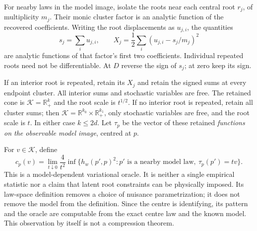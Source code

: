 \documentclass[11pt,reqno]{amsart}
\numberwithin{equation}{section}
\theoremstyle{definition}
\theoremstyle{remark}
\newcommand{\R}{\mathbb R}
\newcommand{\cK}{\mathcal K}
\begin{document}
For nearby laws in the model image, isolate the roots near each central root $r_j$, of multiplicity $m_j$. Their monic cluster factor is an analytic function of the recovered coefficients. Writing the root displacements as $u_{j,i}$, the quantities
\[
 s_j=\sum_i u_{j,i},\qquad
 X_j=\frac12\sum_i(u_{j,i}-s_j/m_j)^2
\]
are analytic functions of that factor's first two coefficients. Individual repeated roots need not be differentiable. At $D$ reverse the sign of $s_j$; at zero keep its sign.

If an interior root is repeated, retain its $X_j$ and retain the signed sums at every endpoint cluster. All interior sums and stochastic variables are free. The retained cone is $\cK=\R_+^k$ and the root scale is $t^{1/2}$. If no interior root is repeated, retain all cluster sums; then $\cK=\R^{k_0}\times\R_+^{k_1}$, only stochastic variables are free, and the root scale is $t$. In either case $k\le2d$. Let $\tau_p$ be the vector of these retained \emph{functions on the observable model image}, centred at $p$.

For $v\in\cK$, define
\begin{equation}\label{eq:law-cost}
 c_p(v)=\lim_{t\downarrow0}\frac4{t^2}
  \inf\{h_w(p',p)^2:p'\text{ is a nearby model law},\ \tau_p(p')=tv\}.
\end{equation}
This is a model-dependent variational oracle. It is neither a single empirical statistic nor a claim that latent root constraints can be physically imposed. Its law-space definition removes a choice of nuisance parametrization; it does not remove the model from the definition. Since the centre is identifying, its pattern and the oracle are computable from the exact centre law and the known model. This observation by itself is not a compression theorem.
\end{document}
